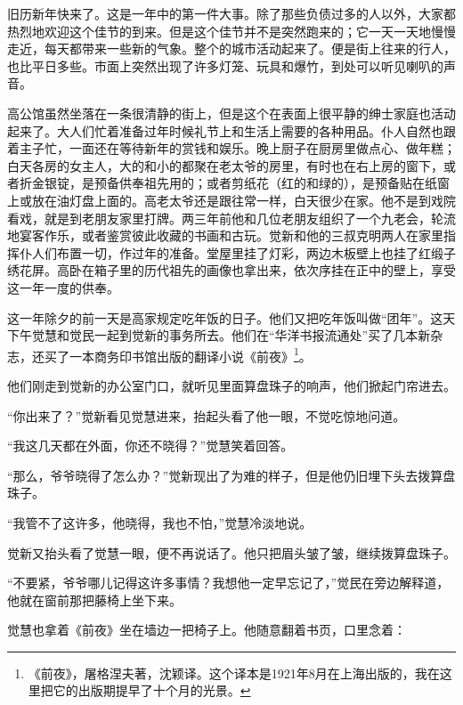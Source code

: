 \par 旧历新年快来了。这是一年中的第一件大事。除了那些负债过多的人以外，大家都热烈地欢迎这个佳节的到来。但是这个佳节并不是突然跑来的；它一天一天地慢慢走近，每天都带来一些新的气象。整个的城市活动起来了。便是街上往来的行人，也比平日多些。市面上突然出现了许多灯笼、玩具和爆竹，到处可以听见喇叭的声音。
\par 高公馆虽然坐落在一条很清静的街上，但是这个在表面上很平静的绅士家庭也活动起来了。大人们忙着准备过年时候礼节上和生活上需要的各种用品。仆人自然也跟着主子忙，一面还在等待新年的赏钱和娱乐。晚上厨子在厨房里做点心、做年糕；白天各房的女主人，大的和小的都聚在老太爷的房里，有时也在右上房的窗下，或者折金银锭，是预备供奉祖先用的；或者剪纸花（红的和绿的），是预备贴在纸窗上或放在油灯盘上面的。高老太爷还是跟往常一样，白天很少在家。他不是到戏院看戏，就是到老朋友家里打牌。两三年前他和几位老朋友组织了一个九老会，轮流地宴客作乐，或者鉴赏彼此收藏的书画和古玩。觉新和他的三叔克明两人在家里指挥仆人们布置一切，作过年的准备。堂屋里挂了灯彩，两边木板壁上也挂了红缎子绣花屏。高卧在箱子里的历代祖先的画像也拿出来，依次序挂在正中的壁上，享受这一年一度的供奉。
\par 这一年除夕的前一天是高家规定吃年饭的日子。他们又把吃年饭叫做“团年”。这天下午觉慧和觉民一起到觉新的事务所去。他们在“华洋书报流通处”买了几本新杂志，还买了一本商务印书馆出版的翻译小说《前夜》\footnote{《前夜》，屠格涅夫著，沈颖译。这个译本是1921年8月在上海出版的，我在这里把它的出版期提早了十个月的光景。}。
\par 他们刚走到觉新的办公室门口，就听见里面算盘珠子的响声，他们掀起门帘进去。
\par “你出来了？”觉新看见觉慧进来，抬起头看了他一眼，不觉吃惊地问道。
\par “我这几天都在外面，你还不晓得？”觉慧笑着回答。
\par “那么，爷爷晓得了怎么办？”觉新现出了为难的样子，但是他仍旧埋下头去拨算盘珠子。
\par “我管不了这许多，他晓得，我也不怕，”觉慧冷淡地说。
\par 觉新又抬头看了觉慧一眼，便不再说话了。他只把眉头皱了皱，继续拨算盘珠子。
\par “不要紧，爷爷哪儿记得这许多事情？我想他一定早忘记了，”觉民在旁边解释道，他就在窗前那把藤椅上坐下来。
\par 觉慧也拿着《前夜》坐在墙边一把椅子上。他随意翻着书页，口里念着：

